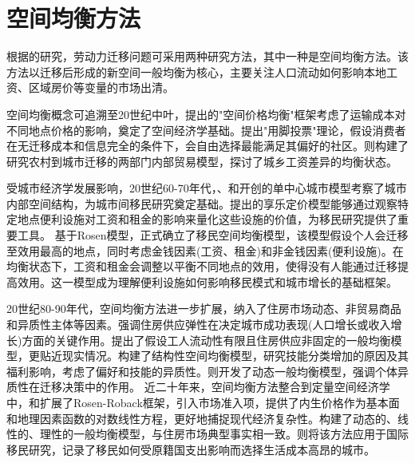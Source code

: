 \documentclass[
  a4paper,
  zihao=-4,
  fontset=mac,
  AutoFakeBold,
  AutoFakeSlant,
  oneside]{ctexbook}
\begin{document}
\section{空间均衡方法}

根据\textcite{jiaEconomicsInternalMigration2023}的研究，劳动力迁移问题可采用两种研究方法，其中一种是空间均衡方法。该方法以迁移后形成的新空间一般均衡为核心，主要关注人口流动如何影响本地工资、区域房价等变量的市场出清。

空间均衡概念可追溯至20世纪中叶，\textcite{samuelsonSpatialPriceEquilibrium1952}提出的"空间价格均衡"框架考虑了运输成本对不同地点价格的影响，奠定了空间经济学基础。\textcite{tieboutPureTheoryLocal1956}提出"用脚投票"理论，假设消费者在无迁移成本和信息完全的条件下，会自由选择最能满足其偏好的社区。\textcite{harrisMigrationUnemploymentDevelopment1970}则构建了研究农村到城市迁移的两部门内部贸易模型，探讨了城乡工资差异的均衡状态。

受城市经济学发展影响，20世纪60-70年代，\textcite{alonsoLocationLandUse1964}、\textcite{muthCitiesHousingSpatial1969}和\textcite{millsAggregativeModelResource1967}开创的单中心城市模型考察了城市内部空间结构，为城市间移民研究奠定基础。\textcite{rosenHedonicPricesImplicit1974}提出的享乐定价模型能够通过观察特定地点便利设施对工资和租金的影响来量化这些设施的价值，为移民研究提供了重要工具。
基于Rosen模型，\textcite{robackWagesRentsQuality1982}正式确立了移民空间均衡模型，该模型假设个人会迁移至效用最高的地点，同时考虑金钱因素(工资、租金)和非金钱因素(便利设施)。在均衡状态下，工资和租金会调整以平衡不同地点的效用，使得没有人能通过迁移提高效用。这一模型成为理解便利设施如何影响移民模式和城市增长的基础框架。

20世纪80-90年代，空间均衡方法进一步扩展，纳入了住房市场动态、非贸易商品和异质性主体等因素。\textcite{glaeserWealthCitiesAgglomeration2009}强调住房供应弹性在决定城市成功表现(人口增长或收入增长)方面的关键作用。\textcite{morettiLocalLaborMarkets2011}提出了假设工人流动性有限且住房供应非固定的一般均衡模型，更贴近现实情况。\textcite{diamondDeterminantsWelfareImplications2016}构建了结构性空间均衡模型，研究技能分类增加的原因及其福利影响，考虑了偏好和技能的异质性。\textcite{coen-piraniEffectHouseholdAppliances2010}则开发了动态一般均衡模型，强调个体异质性在迁移决策中的作用。
近二十年来，空间均衡方法整合到定量空间经济学中，\textcite{ahlfeldtEconomicsDensityEvidence2015}和\textcite{reddingQuantitativeSpatialEconomics2017}扩展了Rosen-Roback框架，引入市场准入项，提供了内生价格作为基本面和地理因素函数的对数线性方程，更好地捕捉现代经济复杂性。\textcite{glaeserHousingDynamicsUrban2014}构建了动态的、线性的、理性的一般均衡模型，与住房市场典型事实相一致。\textcite{albertImmigrationSpatialEquilibrium2022}则将该方法应用于国际移民研究，记录了移民如何受原籍国支出影响而选择生活成本高昂的城市。
\end{document}
